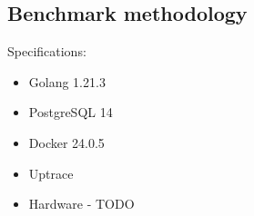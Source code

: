 



\subsection{Benchmark methodology}
Specifications:
\begin{itemize}
    \item Golang 1.21.3
    \item PostgreSQL 14
    \item Docker 24.0.5
    \item Uptrace
    \item Hardware - TODO
\end{itemize}


% 




